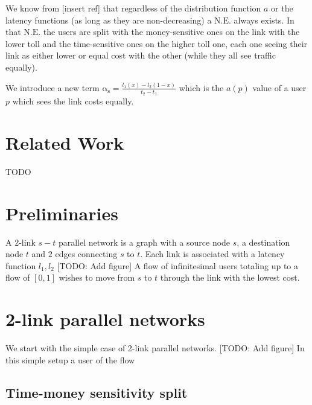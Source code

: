 \documentclass[10pt,a4paper]{book}
\newcommand{\NE}{\mathrm{N.E.}}
\newcommand{\as}{\mathrm{\alpha_s}}
\theoremstyle{definition}
\theoremstyle{comment}
\begin{document}
We know from [insert ref] that regardless of the distribution function $a$ or the latency functions (as long as they are non-decreasing) a $\NE$ always exists.
In that $\NE$ the users are split with the money-sensitive ones on the link with the lower toll and the time-sensitive ones on the higher toll one, each one seeing their link as either lower or equal cost with the other (while they all see traffic equally).

We introduce a new term $\as=\frac{l_1(x)-l_2(1-x)}{t_2-t_1}$ which is the $a(p)$ value of a user $p$ which sees the link costs equally.


\chapter{Related Work}
TODO


\chapter{Preliminaries}

A 2-link $s-t$ parallel network is a graph with a source node $s$, a destination node $t$ and $2$ edges connecting $s$ to $t$.
Each link is associated with a latency function $l_1, l_2$
[TODO: Add figure]
A flow of infinitesimal users totaling up to a flow of $[0, 1]$ wishes to move from $s$ to $t$ through the link with the lowest cost.


\chapter{2-link parallel networks}

We start with the simple case of 2-link parallel networks.
[TODO: Add figure]
In this simple setup a user of the flow 

\section{Time-money sensitivity split}
\end{document}
